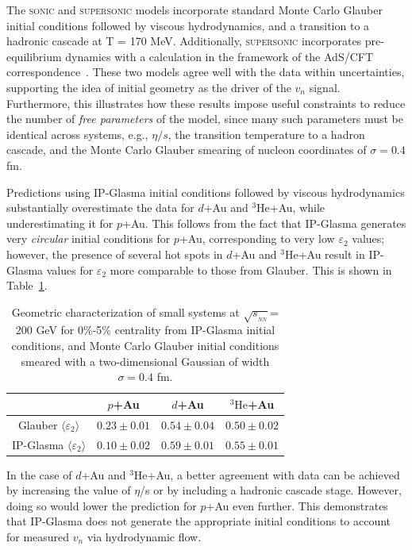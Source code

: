 \documentclass[%
reprint,
showpacs,preprintnumbers,
 amsmath,amssymb,
 aps,
]{revtex4-1}
\newcommand{\sqsn}{\mbox{$\sqrt{s_{_{NN}}}$}\xspace}
\newcommand{\dau}{\mbox{$d$+Au}\xspace}
\newcommand{\pau}{\mbox{$p$+Au}\xspace}
\newcommand{\hau}{\mbox{$^3\text{He}$+Au}\xspace}
\begin{document}
The \textsc{sonic} and \textsc{supersonic} models incorporate standard Monte Carlo Glauber initial conditions followed by viscous hydrodynamics, and a transition to a hadronic cascade at T = 170 MeV. Additionally, \textsc{supersonic} incorporates pre-equilibrium dynamics with a calculation in the framework of the AdS/CFT correspondence~\cite{vanderSchee:2013pia,Chesler:2015wra,Romatschke:2013re}. These two models agree well with the data within uncertainties, supporting the idea of initial geometry as the driver of the $v_n$ signal. Furthermore, this illustrates how these results impose useful constraints to reduce the number of \emph{free parameters} of the model, since many such parameters must be identical across systems, e.g., $\eta/s$, the transition temperature to a hadron cascade, and the  Monte Carlo Glauber smearing of nucleon coordinates of $\sigma=0.4$ fm.

Predictions using IP-Glasma initial conditions followed by viscous hydrodynamics substantially overestimate the data for \dau and \hau, while underestimating it for \pau. This follows from the fact that IP-Glasma generates very \emph{circular} initial conditions for \pau, corresponding to very low $\varepsilon_2$ values; however, the presence of several hot spots in \dau and \hau result in IP-Glasma values for $\varepsilon_2$ more comparable to those from Glauber. This is shown in Table~\ref{table_geometry_glasma}. 

\begin{table}[h!]
\caption{Geometric characterization of small systems at \sqsn = 200 GeV for 0\%-5\% centrality from IP-Glasma initial conditions, and Monte Carlo Glauber initial conditions smeared with a two-dimensional Gaussian of width $\sigma=0.4$ fm.}
\begin{ruledtabular}
\begin{tabular}{c c c c}
\label{table_geometry_glasma}
 & \pau & \dau & \hau \\ \hline
 Glauber $\langle \varepsilon_2 \rangle$ & $0.23\pm 0.01$ & $0.54\pm 0.04$ & $0.50\pm 0.02$ \\
 IP-Glasma $\langle \varepsilon_2 \rangle$ & $0.10\pm 0.02$ & $0.59\pm 0.01$ & $0.55\pm 0.01$ \\
\end{tabular}
\end{ruledtabular}
\end{table}

In the case of \dau and \hau, a better agreement with data can be achieved by increasing the value of $\eta$/s or by including a hadronic cascade stage. However, doing so would lower the prediction for \pau even further. This demonstrates that IP-Glasma does not generate the appropriate initial conditions to account for measured $v_n$ via hydrodynamic flow. 
\end{document}
